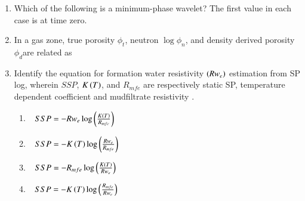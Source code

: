 \documentclass[journal,12pt,onecolumn]{IEEEtran}
\theoremstyle{remark}
\begin{document}
\begin{enumerate}[start = 21]
    \item  Which of the following is a minimum-phase wavelet? The first value in each case is at time zero. \hfill{} 
            \begin {enumerate}
            \end{enumerate}
    \item In a gas zone, true porosity $\phi_t$, neutron $\log{\phi_n}$, and density derived porosity $\phi_d$are related as \hfill{} 
            \begin {enumerate}
            \end{enumerate}
    \item Identify the equation for formation water resistivity $\left(Rw_e\right)$ estimation from SP log, wherein $SSP$, $K\left(T\right)$, and $R_{mfe}$ are respectively static SP, temperature dependent coefficient and mudfiltrate resistivity . \hfill{} 
            
            \begin{enumerate}
                \item $\hspace{.25cm}SSP=-Rw_e\log{\ensuremath{\left(\frac{K\left(T\right)}{R_{mfe}}\right)}}$
                \item $\hspace{.25cm}SSP=-K\left(T\right)\log{\ensuremath{\left(\frac{Rw_e}{R_{mfe}}\right)}}$
                \item $\hspace{.25cm}SSP=-R_{mfe}\log{\ensuremath{\left(\frac{K\left(T\right)}{Rw_e}\right)}}$
                \item $\hspace{.25cm}SSP=-K\left(T\right)\log{\ensuremath{\left(\frac{R_{mfe}}{Rw_e}\right)}}$
            \end{enumerate}
            

\end{enumerate}
\end{document}
